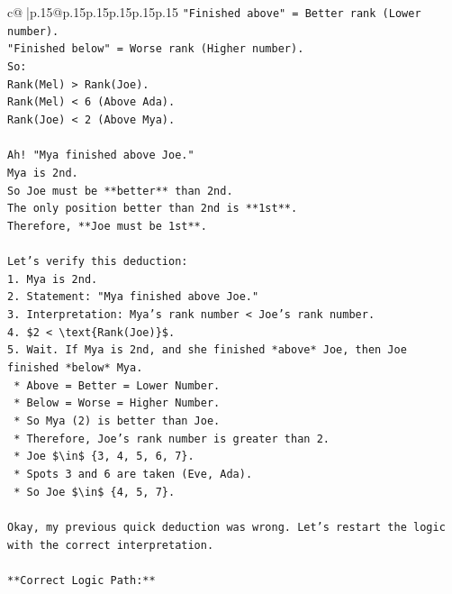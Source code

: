 \documentclass{article}
\begin{document}
{\begin{supertabular}{c@{$\;$}|p{.15\linewidth}@{}p{.15\linewidth}p{.15\linewidth}p{.15\linewidth}p{.15\linewidth}p{.15\linewidth}}
{{{\texttt{"Finished above" = Better rank (Lower number).} \\
\texttt{"Finished below" = Worse rank (Higher number).} \\
\texttt{So:} \\
\texttt{Rank(Mel) > Rank(Joe).} \\
\texttt{Rank(Mel) < 6 (Above Ada).} \\
\texttt{Rank(Joe) < 2 (Above Mya).} \\
\\ 
\texttt{Ah! "Mya finished above Joe."} \\
\texttt{Mya is 2nd.} \\
\texttt{So Joe must be **better** than 2nd.} \\
\texttt{The only position better than 2nd is **1st**.} \\
\texttt{Therefore, **Joe must be 1st**.} \\
\\ 
\texttt{Let's verify this deduction:} \\
\texttt{1.  Mya is 2nd.} \\
\texttt{2.  Statement: "Mya finished above Joe."} \\
\texttt{3.  Interpretation: Mya's rank number < Joe's rank number.} \\
\texttt{4.  \$2 < \textbackslash{}text\{Rank(Joe)\}\$.} \\
\texttt{5.  Wait. If Mya is 2nd, and she finished *above* Joe, then Joe finished *below* Mya.} \\
\texttt{    *   Above = Better = Lower Number.} \\
\texttt{    *   Below = Worse = Higher Number.} \\
\texttt{    *   So Mya (2) is better than Joe.} \\
\texttt{    *   Therefore, Joe's rank number is greater than 2.} \\
\texttt{    *   Joe \$\textbackslash{}in\$ \{3, 4, 5, 6, 7\}.} \\
\texttt{    *   Spots 3 and 6 are taken (Eve, Ada).} \\
\texttt{    *   So Joe \$\textbackslash{}in\$ \{4, 5, 7\}.} \\
\\ 
\texttt{Okay, my previous quick deduction was wrong. Let's restart the logic with the correct interpretation.} \\
\\ 
\texttt{**Correct Logic Path:**} \\
\\ 
}}}
\end{supertabular}}
\end{document}
